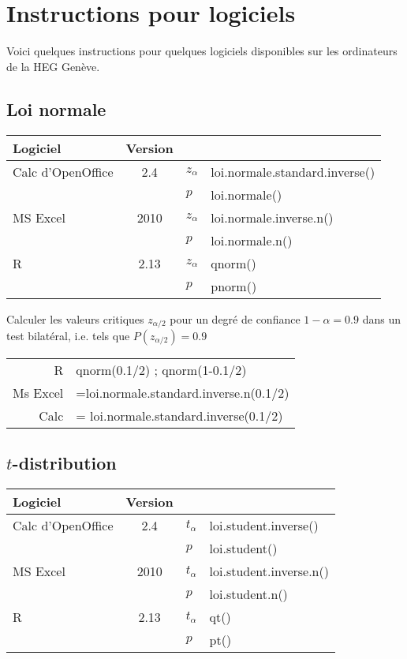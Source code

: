 \chapter{Instructions pour logiciels}

Voici quelques instructions pour quelques logiciels disponibles sur les ordinateurs de la HEG Gen\`eve.

\section{Loi normale}
\begin{tabular}{lc|l@{ = }l}
	Logiciel & Version \\
	\hline
	Calc d'OpenOffice & 2.4 & $z_{\alpha}$ & {\sc loi.normale.standard.inverse}()\\
	 &  & $p$ & {\sc loi.normale}()\\
	MS Excel & 2010 & $z_{\alpha}$ & {\sc loi.normale.inverse.n}()\\
	 &  & $p$ & {\sc loi.normale.n}()\\
	R & 2.13 & $z_{\alpha}$ & qnorm()\\
	  &       & $p$          & pnorm()\\
\end{tabular}

\begin{ex}
Calculer les valeurs critiques $z_{\alpha/2}$ pour un degr\'e de confiance $1-\alpha=0.9$ dans un test bilat\'eral, i.e. tels que $P(z_{\alpha/2})=0.9$

\begin{tabular}{|rl|}
\hline
	R & qnorm(0.1/2) ; qnorm(1-0.1/2)\\
	Ms Excel & {\sc =loi.normale.standard.inverse.n(0.1/2)}\\
	Calc & = {\sc loi.normale.standard.inverse(0.1/2)}\\
\hline
\end{tabular}
\end{ex}

\section{$t$-distribution}
\begin{tabular}{lc|l@{ = }l}
	Logiciel & Version \\
	\hline
	Calc d'OpenOffice & 2.4 & $t_{\alpha}$ & {\sc loi.student.inverse}()\\
	 &  & $p$ & {\sc loi.student}()\\
	MS Excel & 2010 & $t_{\alpha}$ & {\sc loi.student.inverse.n}()\\
	 &  & $p$ & {\sc loi.student.n}()\\
	R & 2.13 & $t_{\alpha}$ & qt()\\
	  &       & $p$          & pt()\\
\end{tabular}

